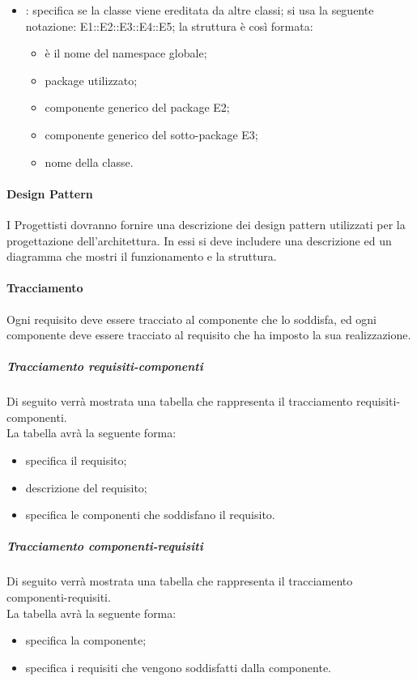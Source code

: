 \begin{itemize}
\item {}: specifica se la classe viene ereditata da altre classi; si usa la seguente notazione: E1::E2::E3::E4::E5; la struttura è così formata:
\begin{itemize}
\item {}è il nome del namespace globale;
\item {}package utilizzato;
\item {}componente generico del package E2;
\item {}componente generico del sotto-package E3;
\item {}nome della classe.
\end{itemize}
\end{itemize}

\paragraph{Design Pattern}
\label{}
I Progettisti dovranno fornire una descrizione dei design pattern utilizzati per la progettazione dell'architettura. In essi si deve includere una descrizione ed un diagramma che mostri il funzionamento e la struttura.



\paragraph{Tracciamento}
\label{}
Ogni requisito deve essere tracciato al componente che lo soddisfa, ed ogni componente deve essere tracciato al requisito che ha imposto la sua realizzazione.

\subparagraph{Tracciamento requisiti-componenti}
Di seguito verrà mostrata una tabella che rappresenta il tracciamento requisiti-componenti. \\
La tabella avrà la seguente forma:
\begin{itemize}
\item {}specifica il requisito;
\item {}descrizione del requisito;
\item {}specifica le componenti che soddisfano il requisito.
\end{itemize}

\subparagraph{Tracciamento componenti-requisiti}
Di seguito verrà mostrata una tabella che rappresenta il tracciamento componenti-requisiti. \\
La tabella avrà la seguente forma:
\begin{itemize}
\item {}specifica la componente;
\item {}specifica i requisiti che vengono soddisfatti dalla componente.
\end{itemize}

